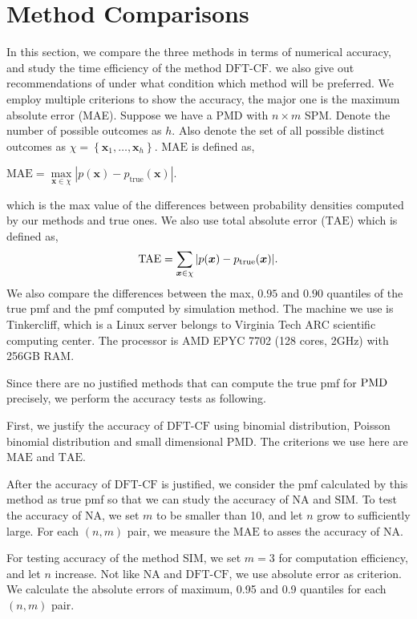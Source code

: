 \documentclass[12pt]{article}
\newcommand{\TAE}{{\textrm{TAE}}}
\newcommand{\MAE}{{\textrm{MAE}}}
\newcommand{\PMD}{{\normalfont\textrm{PMD}}}
\newcommand{\xvec}{\boldsymbol{x}}
\newcommand{\SIM}{{\textrm{SIM}}}
\newcommand{\NA}{{\textrm{NA}}}
\newcommand{\dft}{{\textrm{DFT-CF}}}
\begin{document}
\section{Method Comparisons}\label{sec:Method Comparisons}
In this section, we compare the three methods in terms of numerical accuracy, and study the time efficiency of the method $\dft$. we also give out recommendations of under what condition which method will be preferred. We employ multiple criterions to show the accuracy, the major one is the maximum absolute error (MAE). Suppose we have a PMD with $n\times m$ SPM. Denote the number of possible outcomes as $h$. Also denote the set of all possible distinct outcomes as $\chi = \left\{\xvec_1,\dots, \xvec_{h}\right\}$. $\MAE$ is defined as,
\begin{center}
$\mathrm{\MAE} = \underset{\xvec \in \chi}{\max}|p(\xvec) - p_{\text{true}}(\xvec)|$.
\end{center}
which is the max value of the differences between probability densities computed by our methods and true ones.
We also use total absolute error ($\TAE$) which is defined as,
\begin{align*}
    \mbox{\TAE} = \sum_{\xvec \in \chi} |p(\xvec) - p_{\text{true}}(\xvec)|.
\end{align*}
We also compare the differences between the max, $0.95$ and $0.90$ quantiles of the true pmf and the pmf computed by simulation method. The machine we use is Tinkercliff, which is a Linux server belongs to Virginia Tech ARC scientific computing center. The processor is AMD EPYC 7702 (128 cores, 2GHz) with 256GB RAM.

Since there are no justified methods that can compute the true pmf for $\PMD$ precisely, we perform the accuracy tests as following.

First, we justify the accuracy of $\dft$ using binomial distribution, Poisson binomial distribution and small dimensional PMD. The criterions we use here are $\MAE$ and $\TAE$.

After the accuracy of $\dft$ is justified, we consider the pmf calculated by this method as true pmf so that we can study the accuracy of $\NA$ and $\SIM$. To test the accuracy of $\NA$, we set $m$ to be smaller than 10, and let $n$ grow to sufficiently large. For each $(n,m)$ pair, we measure the $\MAE$ to asses the accuracy of $\NA$.

For testing accuracy of the method $\SIM$, we set $m=3$ for computation efficiency, and let $n$ increase. Not like $\NA$ and $\dft$, we use absolute error as criterion. We calculate the absolute errors of maximum, 0.95 and 0.9 quantiles for each $(n,m)$ pair.
\end{document}

